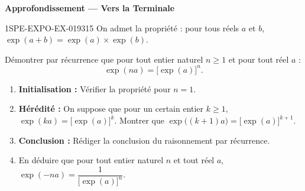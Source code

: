 \begin{center}\textbf{Approfondissement — Vers la Terminale}\end{center}
\begin{exercice}{1SPE-EXPO-EX-019}{3}{15}
On admet la propriété : pour tous réels $a$ et $b$, $\exp(a+b) = \exp(a) \times \exp(b)$.

Démontrer par récurrence que pour tout entier naturel $n \geqslant 1$ et pour tout réel $a$ :
\[ \exp(na) = \bigl[\exp(a)\bigr]^n. \]
\begin{enumerate}
  \item \textbf{Initialisation :} Vérifier la propriété pour $n=1$.
  \item \textbf{Hérédité :} On suppose que pour un certain entier $k \geqslant 1$, $\exp(ka) = \bigl[\exp(a)\bigr]^k$. Montrer que $\exp\bigl((k+1)a\bigr) = \bigl[\exp(a)\bigr]^{k+1}$.
  \item \textbf{Conclusion :} Rédiger la conclusion du raisonnement par récurrence.
  \item En déduire que pour tout entier naturel $n$ et tout réel $a$, $\exp(-na) = \dfrac{1}{\bigl[\exp(a)\bigr]^n}$.
\end{enumerate}
\end{exercice}

